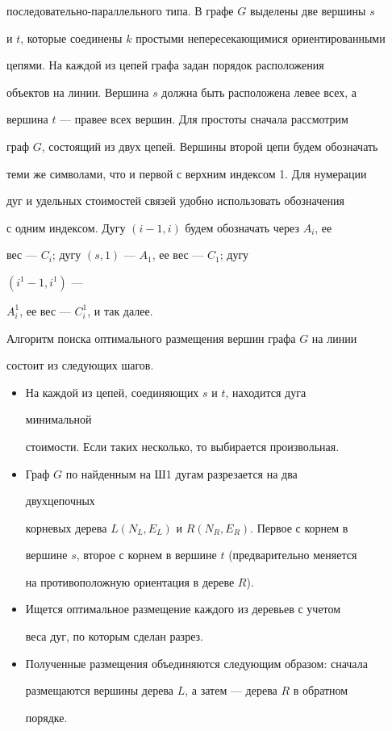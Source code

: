 последовательно-параллельного типа. В графе $G$ выделены две вершины $s$


и $t$, которые соединены $k$ простыми непересекающимися ориентированными


цепями. На каждой из цепей графа задан порядок расположения


объектов на линии. Вершина $s$ должна быть расположена левее всех, а


вершина $t$ --- правее всех вершин. Для простоты сначала рассмотрим


граф $G$, состоящий из двух цепей. Вершины второй цепи будем обозначать


теми же символами, что и первой с верхним индексом 1. Для нумерации


дуг и удельных стоимостей связей удобно использовать обозначения


с одним индексом. Дугу $(i-1,i)$ будем обозначать через $A_i$, ее


вес --- $C_i$; дугу $(s,1)$ --- $A_1$, ее вес --- $C_1$; дугу


$(i^1-1,i^1)$ ---


$A^1_i$, ее вес --- $C^1_i$, и так далее.





Алгоритм поиска оптимального размещения вершин графа $G$ на линии


состоит из следующих шагов.


\begin{itemize}


\item[Ш1.] На каждой из цепей, соединяющих $s$ и $t$, находится дуга


минимальной


стоимости. Если таких несколько, то выбирается произвольная.


\item[Ш2.] Граф $G$ по найденным на Ш1 дугам разрезается на два


двухцепочных


корневых дерева $L(N_L,E_L)$ и $R(N_R,E_R)$. Первое с корнем в


вершине $s$, второе с корнем в вершине $t$ (предварительно меняется


на противоположную ориентация в дереве $R$).


\item[Ш3.] Ищется оптимальное размещение каждого из деревьев с учетом


веса дуг, по которым сделан разрез.


\item[Ш4.] Полученные размещения объединяются следующим образом: сначала


размещаются вершины дерева $L$, а затем --- дерева $R$ в обратном


порядке.


\end{itemize}





